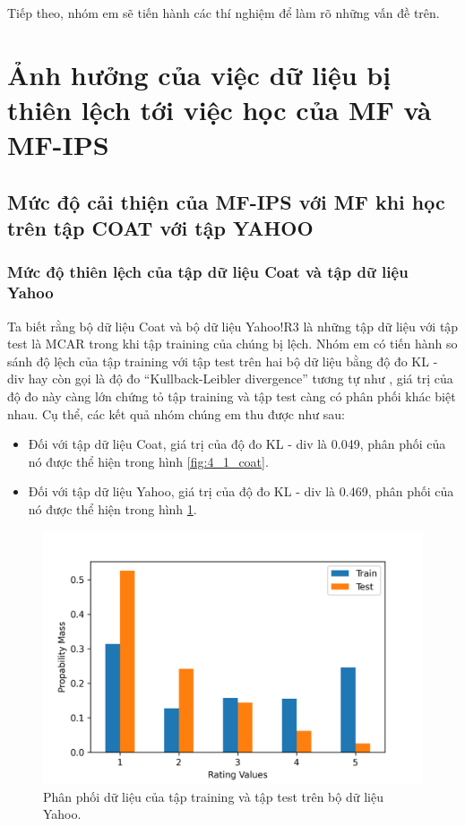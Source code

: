 Tiếp theo, nhóm em sẽ tiến hành các thí nghiệm để làm rõ những vấn đề trên.

\section{Ảnh hưởng của việc dữ liệu bị thiên lệch tới việc học của MF và MF-IPS}
\subsection{Mức độ cải thiện của MF-IPS với MF khi học trên tập COAT với tập YAHOO}
\subsubsection{Mức độ thiên lệch của tập dữ liệu Coat và tập dữ liệu Yahoo}
Ta biết rằng bộ dữ liệu Coat và bộ dữ liệu Yahoo!R3 là những tập dữ liệu với tập test là MCAR trong khi tập training của chúng bị lệch. Nhóm em có tiến hành so sánh độ lệch của tập training với tập test trên hai bộ dữ liệu bằng độ đo KL - div hay còn gọi là độ đo ``Kullback-Leibler divergence'' tương tự như \cite{saito2020asymmetric}, giá trị của độ đo này càng lớn chứng tỏ tập training và tập test càng có phân phối khác biệt nhau. Cụ thể, các kết quả nhóm chúng em thu được như sau: 
\begin{itemize}
    \item Đối với tập dữ liệu Coat, giá trị của độ đo KL - div là 0.049, phân phối của nó được thể hiện trong hình \ref{fig:4_1_coat}.
    \item Đối với tập dữ liệu Yahoo, giá trị của độ đo KL - div là 0.469, phân phối của nó được thể hiện trong hình \ref{fig:4_2_yahoo}.
\end{itemize}

\begin{figure}[h]
    \centering
    \includegraphics[width=\textwidth]{images/Chapter4/Diff_yahoo.png}
    \caption{Phân phối dữ liệu của tập training và tập test trên bộ dữ liệu Yahoo.}
    \label{fig:4_2_yahoo}
\end{figure}

